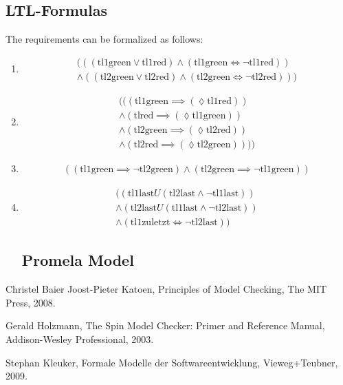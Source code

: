 \documentclass[a4paper, twoside]{article}
\begin{document}
\subsection{LTL-Formulas}
\label{sec:exampleltl}

The requirements can be formalized as follows:

\begin{enumerate}
\item 
  \begin{multline}
    (((\text{tl1green} \lor \text{tl1red}) \land (\text{tl1green}\iff \neg \text{tl1red})) \\ \land((\text{tl2green} \lor \text{tl2red})\land (\text{tl2green} \iff \neg \text{tl2red})))
  \end{multline}
\item
  \begin{multline}
    \label{eq:unnumbered}
    (((\text{tl1green} \implies (\lozenge \text{tl1red})) \\
    \land (\text{tlred} \implies (\lozenge \text{tl1green}))\\
    \land (\text{tl2green} \implies (\lozenge \text{tl2red})) \\
    \land (\text{tl2red} \implies (\lozenge \text{tl2green}))))
  \end{multline}
\item
  \begin{multline}
    \label{eq:unnumbered}
    ((\text{tl1green} \implies \neg \text{tl2green}) \land (\text{tl2green} \implies \neg \text{tl1green}))
  \end{multline}
\item
  \begin{multline}
    \label{eq:unnumbered}
    ((\text{tl1last} U(\text{tl2last} \land \neg \text{tl1last})) \\
    \land (\text{tl2last} U (\text{tl1last} \land \neg \text{tl2last}))\\
\land(\text{tl1zuletzt} \iff \neg \text{tl2last}))
  \end{multline}

\subsection{Promela Model}
\label{sec:trafficlightsmodel}



\end{enumerate}


\appendix

\begin{thebibliography}{9}
Christel Baier Joost-Pieter Katoen,
Principles of Model Checking,
The MIT Press,
2008.

Gerald Holzmann,
The Spin Model Checker: Primer and Reference Manual,
Addison-Wesley Professional,
2003.

Stephan Kleuker,
Formale Modelle der Softwareentwicklung,
Vieweg+Teubner,
2009.

\end{thebibliography}
\end{document}

